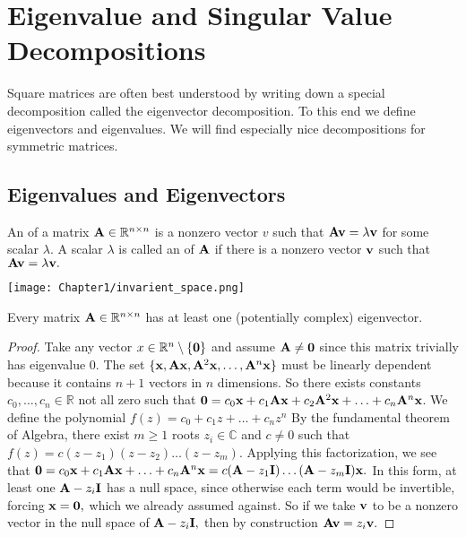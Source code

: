 \section{Eigenvalue and Singular Value Decompositions}\label{eig-sing}

Square matrices are often best understood by writing down a special decomposition called the eigenvector decomposition. To this end we define eigenvectors and eigenvalues. We will find especially nice decompositions for symmetric matrices.

\subsection{Eigenvalues and Eigenvectors} 

\begin{definition}
An  of a matrix $\MA \in \mathbb R^{n \times n}$  is a nonzero vector $v$ such that $\MA\vv = \lambda \vv$ for some scalar $\lambda. $ A scalar $\lambda$ is called an  of $\MA$ if there is a nonzero vector $\vv$ such that $\MA\vv = \lambda \vv.$ 
\end{definition}

\begin{center}
  \texttt{[image: Chapter1/invarient\_space.png]}
\end{center}

\begin{proposition}
Every matrix $\MA \in \mathbb R^{n \times n}$ has at least one (potentially complex) eigenvector. 
\end{proposition}
\begin{proof}
Take any vector $x \in \mathbb R^n \setminus \{ \vzero\} $ and assume $\MA \not = \vzero$ since this matrix trivially has eigenvalue 0. The set 
$\{\vx, \MA\vx, \MA^2 \vx, \ldots, \MA^n \vx\}$
must be linearly dependent because it contains $n + 1$ vectors in $n$ dimensions. So there exists constants $c_0, \ldots, c_n \in \mathbb R$ not all zero such that 
$\vzero = c_0 \vx + c_1 \MA\vx + c_2 \MA^2\vx + \ldots +c_n \MA^n \vx$.
We define the polynomial 
$f(z) = c_0 + c_1 z + \ldots + c_n z^n$
By the fundamental theorem of Algebra, there exist $m \geq 1$ roots $z_i \in \mathbb C$ and $c \not = 0$ such that 
$f(z) = c(z- z_1) (z - z_2) \ldots (z - z_m).$
Applying this factorization, we see that 
$
\vzero = c_0 \vx + c_1 \MA\vx  + \ldots +c_n \MA^n \vx =  c (\MA - z_1 \MI) \ldots (\MA - z_m  \MI) \vx.
$
In this form, at least one $\MA - z_i \MI$ has a null space, since otherwise each term would be invertible, forcing $\vx = \vzero,$ which we already assumed against. So if we take $\vv$ to be a nonzero vector in the null space of $\MA - z_i \MI,$ then by construction 
$\MA\vv = z_i \vv.$
\end{proof}


